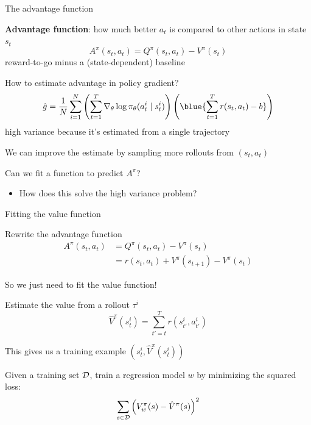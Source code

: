 \documentclass[usenames,dvipsnames,notes,11pt,aspectratio=169,hyperref={colorlinks=true, linkcolor=blue}]{beamer}
\begin{document}
\begin{frame}
    {The advantage function}
    \begin{wideitemize}[<+->]
        \item {\bf Advantage function}: how much better $a_t$ is compared to other actions in state $s_t$
            $$
            A^\pi(s_t, a_t) = Q^\pi(s_t, a_t) - V^\pi(s_t)
            $$
            reward-to-go minus a (state-dependent) baseline
        \item How to estimate advantage in policy gradient?
            $$
            \hat{g} = \frac{1}{N}\sum_{i=1}^N
            \p{\sum_{t=1}^T \nabla_\theta\log \pi_\theta(a_t^i\mid s_t^i)}
                    \p{\blue{\sum_{t=1}^Tr(s_t, a_t) - b}}
            $$
            high variance because it's estimated from a single trajectory
        \item We can improve the estimate by sampling more rollouts from $(s_t, a_t)$
        \item Can we fit a function to predict $A^\pi$?
            \begin{itemize}
                \item How does this solve the high variance problem?
            \end{itemize}
    \end{wideitemize}
\end{frame}

\begin{frame}
    {Fitting the value function}
    \begin{wideitemize}[<+->]
        \item Rewrite the advantage function
            \begin{align*}
                A^\pi(s_t, a_t) &= Q^\pi(s_t, a_t) - V^\pi(s_t)\\
                &= r(s_t, a_t) + V^\pi(s_{t+1}) - V^\pi(s_t)
            \end{align*}
        \item So we just need to fit the value function!
        \item Estimate the value from a rollout $\tau^i$
            $$
            \hat{V}^\pi(s^i_t) = \sum_{t'=t}^T r(s^i_{t'}, a^i_{t'})
            $$
        \item This gives us a training example $(s^i_t, \hat{V}^\pi(s^i_t))$
        \item Given a training set $\mathcal{D}$, train a regression model $w$ by minimizing the squared loss:
            $$
            \sum_{s\in\mathcal{D}} \left( V^\pi_w(s) - \hat{V}^\pi(s) \right)^2
            $$
    \end{wideitemize}
\end{frame}
\end{document}
